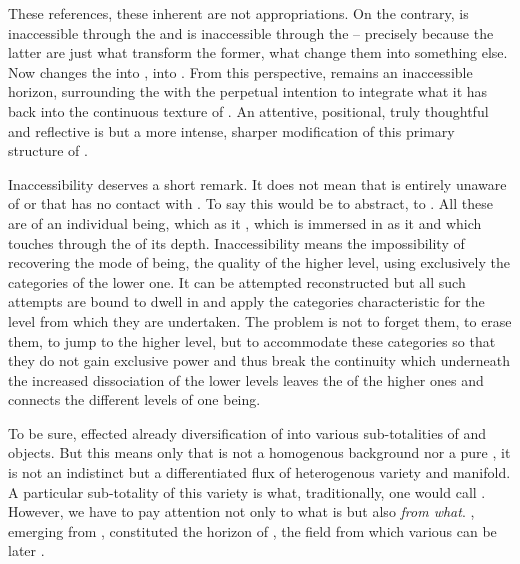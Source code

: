 These references, these inherent  are not appropriations.  On
the contrary,  is inaccessible through the  and
 is inaccessible through the  -- precisely because
the latter are just what transform the former, what change them into something
else. Now  changes the  into ,
into . From this
perspective,  remains an inaccessible horizon, surrounding the
 with the perpetual intention to integrate what it has
 back into the continuous texture of . An
attentive, positional, truly thoughtful and reflective  is but a more intense, sharper modification of this primary
structure of .

\pa
Inaccessibility deserves a short remark. It does not mean that 
 is entirely unaware of  or that 
 has no contact with . To say this would be 
to abstract, to . All these are  of an individual
being, which  
 as it , which is immersed in  
as it  and which touches  through 
the  of its depth. Inaccessibility means the impossibility 
of recovering the mode of being, the quality of the higher level, using
exclusively the categories of the  lower one. It can be attempted reconstructed but all 
such attempts are bound to dwell in and apply the categories 
characteristic for the level from which they are undertaken. The 
problem is not to forget them, to erase them, to jump to the higher 
level, but to accommodate these categories so that they do not gain 
exclusive power and thus break the continuity which underneath 
the increased dissociation of the lower levels leaves the
 of the higher ones and connects the different levels of one
being.

\pa To be sure,  effected already diversification of
 into various sub-totalities of  and objects.  But this
means only that  is not a homogenous background nor a pure
, it is not an indistinct but a differentiated flux of
heterogenous variety and manifold.  A particular sub-totality of this variety is
what, traditionally, one would call .  However, we have to pay
attention not only to what is  but also {\em from what}.
, emerging from , constituted the horizon of
, the field from which various  can be later
.

